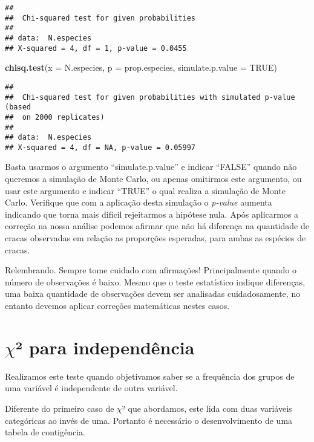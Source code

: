 \documentclass[14pt,titlepage, oneside, openany, a4paper]{book}
\newenvironment{Shaded}{\begin{snugshade}}{\end{snugshade}}
\newcommand{\DataTypeTok}[1]{\textcolor[rgb]{0.13,0.29,0.53}{#1}}
\newcommand{\KeywordTok}[1]{\textcolor[rgb]{0.13,0.29,0.53}{\textbf{#1}}}
\newcommand{\NormalTok}[1]{#1}
\newcommand{\OtherTok}[1]{\textcolor[rgb]{0.56,0.35,0.01}{#1}}
\begin{document}
\begin{verbatim}
## 
##  Chi-squared test for given probabilities
## 
## data:  N.especies
## X-squared = 4, df = 1, p-value = 0.0455
\end{verbatim}

\begin{Shaded}
\begin{Highlighting}[]
\KeywordTok{chisq.test}\NormalTok{(}\DataTypeTok{x =}\NormalTok{ N.especies, }\DataTypeTok{p =}\NormalTok{ prop.especies, }\DataTypeTok{simulate.p.value =} \OtherTok{TRUE}\NormalTok{)}
\end{Highlighting}
\end{Shaded}

\begin{verbatim}
## 
##  Chi-squared test for given probabilities with simulated p-value (based
##  on 2000 replicates)
## 
## data:  N.especies
## X-squared = 4, df = NA, p-value = 0.05997
\end{verbatim}

Basta usarmos o argumento ``simulate.p.value'' e indicar ``FALSE'' quando não queremos a simulação de Monte Carlo, ou apenas omitirmos este argumento, ou usar este argumento e indicar ``TRUE'' o qual realiza a simulação de Monte Carlo. Verifique que com a aplicação desta simulação o \emph{p-value} aumenta indicando que torna mais dificil rejeitarmos a hipótese nula. Após aplicarmos a correção na nossa análise podemos afirmar que não há diferença na quantidade de cracas observadas em relação as proporções esperadas, para ambas as espécies de cracas.

Relembrando. Sempre tome cuidado com afirmações! Principalmente quando o número de observações é baixo. Mesmo que o teste estatístico indique diferenças, uma baixa quantidade de observações devem ser analisadas cuidadosamente, no entanto devemos aplicar correções matemáticas nestes casos.

\hypertarget{chi-para-independuxeancia}{%
\section{\texorpdfstring{\(\chi\)² para independência}{\textbackslash{}chi² para independência}}\label{chi-para-independuxeancia}}

Realizamos este teste quando objetivamos saber se a frequência dos grupos de uma variável é independente de outra variável.

Diferente do primeiro caso de \(\chi\)² que abordamos, este lida com duas variáveis categóricas ao invés de uma. Portanto é necessário o desenvolvimento de uma tabela de contigência.
\end{document}
